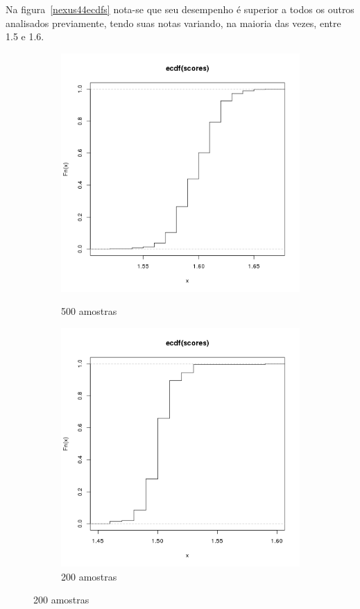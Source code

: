 \documentclass[11pt,a4paper]{article}
\begin{document}
Na figura~\ref{nexus44ecdfs} nota-se que seu desempenho é superior a todos os outros analisados previamente, tendo suas
notas variando, na maioria das vezes, entre 1.5 e 1.6.

\begin{figure}
    \caption{ECDFs - Nexus 7, Android 4.4 Chrome}
    \label{nexus44ecdfs}
    \begin{subfigure}{.5\textwidth}
        \caption{500 amostras}
        \centering
        \includegraphics[width=\textwidth]{images/ecdf-n7-a44-chrome-500-amostras-20131119}
        \label{nexus44500}
    \end{subfigure}
    \begin{subfigure}{.5\textwidth}
        \caption{200 amostras}
        \centering
        \includegraphics[width=\textwidth]{images/ecdf-n7-a44-chrome-200-amostras-20131120}

\end{subfigure}
\end{figure}
\end{document}
